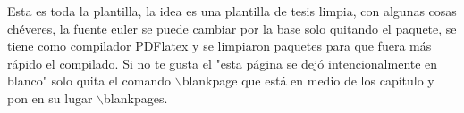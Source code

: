
\thispagestyle{empty}
\vspace{-0.7cm}


Esta es toda la plantilla, la idea es una plantilla de  tesis limpia, con algunas cosas chéveres, la fuente euler se puede cambiar por la base solo quitando el paquete, se tiene como compilador PDFlatex  y se limpiaron paquetes para que fuera más rápido el compilado. Si no te gusta el "esta página se dejó intencionalmente en blanco" solo quita el comando $\backslash$blankpage que está en medio de los capítulo y pon en su lugar $\backslash$blankpages.